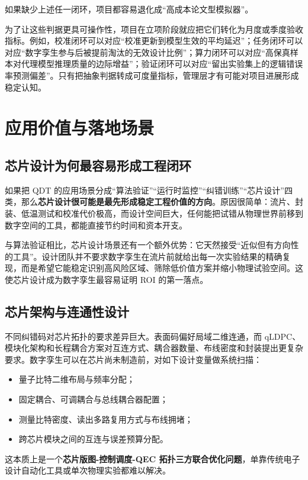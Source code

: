 \documentclass[11pt,a4paper]{article}
\newcommand{\QDT}{QDT}
\newcommand{\QEC}{QEC}
\begin{document}
如果缺少上述任一闭环，项目都容易退化成“高成本论文型模拟器”。

为了让这些判据更具可操作性，项目在立项阶段就应把它们转化为月度或季度验收指标。例如，校准闭环可以对应“校准更新到模型生效的平均延迟”；任务闭环可以对应“数字孪生参与后被提前淘汰的无效设计比例”；算力闭环可以对应“高保真样本对代理模型推理质量的边际增益”；验证闭环可以对应“留出实验集上的逻辑错误率预测偏差”。只有把抽象判据转成可度量指标，管理层才有可能对项目进展形成稳定认知。

\section{应用价值与落地场景}

\subsection{芯片设计为何最容易形成工程闭环}

如果把 \QDT{} 的应用场景分成“算法验证”“运行时监控”“纠错训练”“芯片设计”四类，那么\textbf{芯片设计很可能是最先形成稳定工程价值的方向}。原因很简单：流片、封装、低温测试和校准代价极高，而设计空间巨大，任何能把试错从物理世界前移到数字空间的工具，都能直接节约时间和资本开支。

与算法验证相比，芯片设计场景还有一个额外优势：它天然接受“近似但有方向性的工具”。设计团队并不要求数字孪生在流片前就给出每一次实验结果的精确复现，而是希望它能稳定识别高风险区域、筛除低价值方案并缩小物理试验空间。这使芯片设计成为数字孪生最容易证明 ROI 的第一落点。

\subsection{芯片架构与连通性设计}

不同纠错码对芯片拓扑的要求差异巨大。表面码偏好局域二维连通，而 qLDPC、模块化架构和长程耦合方案对互连方式、耦合器数量、布线密度和封装提出更复杂要求。数字孪生可以在芯片尚未制造前，对如下设计变量做系统扫描：

\begin{itemize}
  \item 量子比特二维布局与频率分配；
  \item 固定耦合、可调耦合与总线耦合器配置；
  \item 测量比特密度、读出多路复用方式与布线拥堵；
  \item 跨芯片模块之间的互连与误差预算分配。
\end{itemize}

这本质上是一个\textbf{芯片版图-控制调度-\QEC{} 拓扑三方联合优化问题}，单靠传统电子设计自动化工具或单次物理实验都难以解决。
\end{document}
